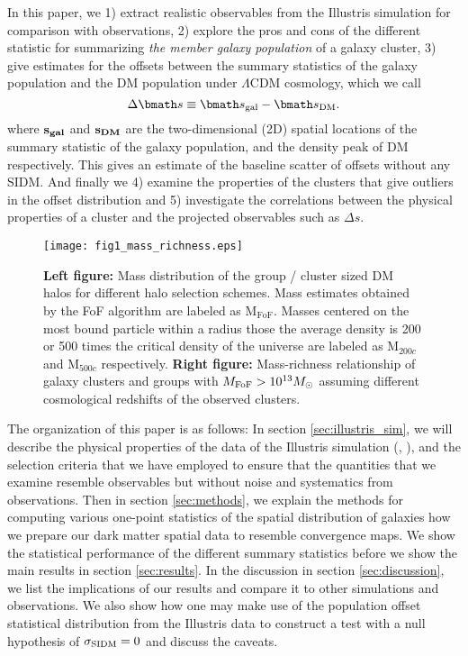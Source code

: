 In this paper, we 
1) extract realistic observables from the Illustris simulation for
comparison with observations, 2) explore the pros and cons of the different statistic for 
summarizing {\it the member galaxy population} of a galaxy cluster, 3)	
give estimates for the offsets between the summary statistics of the galaxy  
population and the DM population under $\Lambda$CDM cosmology, which we call 
\begin{equation}
	\Delta \vec{s} \equiv \vec{s}_{\rm gal} - \vec{s}_{\rm DM}.
\end{equation}
where $\bf{s}_{gal}$ and $\bf{s}_{DM}$ are the two-dimensional (2D) spatial
locations of the summary statistic of the galaxy population, and the density
peak of DM respectively. This gives
an estimate of the baseline scatter of offsets without any SIDM. And finally we 
4) examine the properties of the clusters that give outliers in 
the offset distribution and 5) investigate the  
correlations between the physical properties of a cluster and the projected 
observables such as $\Delta s$. 
\begin{figure*}
	\texttt{[image: fig1\_mass\_richness.eps]}
	\caption{ {\bf Left figure:} Mass distribution of the group / cluster sized 
		DM halos for different halo selection schemes. Mass estimates obtained by the
		FoF algorithm are labeled as  M$_{\text{FoF}}$.
		Masses centered on the most bound particle within a radius those the 
		average density is 200 or 500 times the critical density of the universe are 
		labeled as M$_{200c}$ and M$_{500c}$ respectively. 
		{\bf Right figure:} 
		Mass-richness relationship of galaxy clusters and groups with 
		$M_{\rm FoF} > 10^{13} M_{\odot}$ assuming different cosmological redshifts
		of the observed clusters. 
\label{fig:mass_richness}}
\end{figure*}

The organization of this paper is as follows:
In section \ref{sec:illustris_sim}, we will describe the physical properties of 
the data of the Illustris
simulation (\citealt{Vogelsberger2014}, \citealt{Genel2014a}), 
and the selection criteria that we have employed to ensure that the
quantities that we examine resemble observables but without noise and
systematics from observations. 
Then in section \ref{sec:methods}, 
we explain the methods for computing various 
one-point statistics of the spatial distribution of galaxies how we prepare our dark
matter spatial data to resemble convergence maps. We show the statistical performance
of the different summary statistics before we show the main results
in section \ref{sec:results}. In the discussion in section \ref{sec:discussion}, 
we list the implications of our
results and compare it to other simulations and observations. We also 
show how one may make use of the population offset statistical distribution
from the Illustris data to construct a test with 
a null hypothesis of $\sigma_{\rm SIDM} = 0$ and discuss the caveats. 

